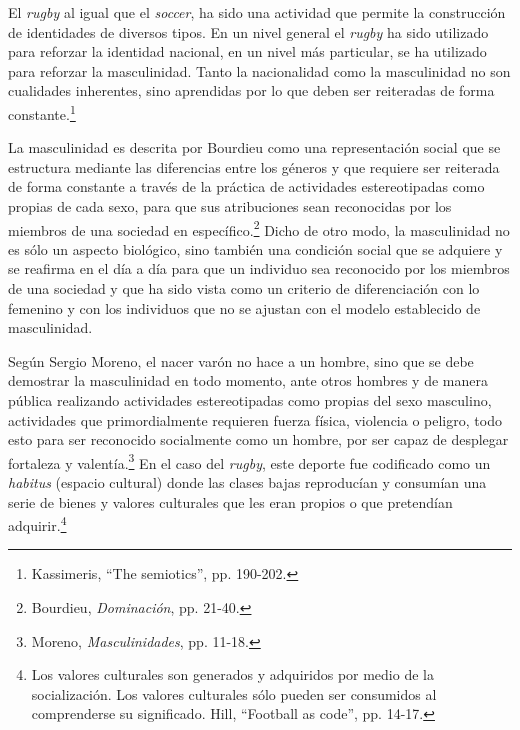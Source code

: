 \documentclass[11pt,a5paper,twoside]{book} %
\begin{document}
El \emph{rugby} al igual que el \emph{soccer}, ha sido una actividad que permite la construcción de identidades de diversos tipos. En un nivel general el \emph{rugby} ha sido utilizado para reforzar la identidad nacional, en un nivel más particular, se ha utilizado para reforzar la masculinidad. Tanto la nacionalidad como la masculinidad no son cualidades inherentes, sino aprendidas por lo que deben ser reiteradas de forma constante.\footnote{Kassimeris, ``The semiotics'', pp. 190-202.}

La masculinidad es descrita por Bourdieu como una representación social que se estructura mediante las diferencias entre los géneros y que requiere ser reiterada de forma constante a través de la práctica de actividades estereotipadas como propias de cada sexo, para que sus atribuciones sean reconocidas por los miembros de una sociedad en específico.\footnote{Bourdieu, \emph{Dominación}, pp. 21-40.} Dicho de otro modo, la masculinidad no es sólo un aspecto biológico, sino también una condición social que se adquiere y se reafirma en el día a día para que un individuo sea reconocido por los miembros de una sociedad y que ha sido vista como un criterio de diferenciación con lo femenino y con los individuos que no se ajustan con el modelo establecido de masculinidad.

Según Sergio Moreno, el nacer varón no hace a un hombre, sino que se debe demostrar la masculinidad en todo momento, ante otros hombres y de manera pública realizando actividades estereotipadas como propias del sexo masculino, actividades que primordialmente requieren fuerza física, violencia o peligro, todo esto para ser reconocido socialmente como un hombre, por ser capaz de desplegar fortaleza y valentía.\footnote{Moreno, \emph{Masculinidades}, pp. 11-18.} En el caso del \emph{rugby}, este deporte fue codificado como un \emph{habitus} (espacio cultural) donde las clases bajas reproducían y consumían una serie de bienes y valores culturales que les eran propios o que pretendían adquirir.\footnote{Los valores culturales son generados y adquiridos por medio de la socialización. Los valores culturales sólo pueden ser consumidos al comprenderse su significado. Hill, ``Football as code'', pp. 14-17.}
\end{document}
